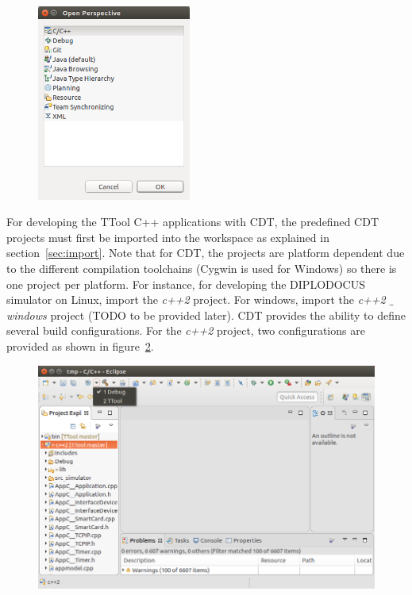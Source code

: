 \documentclass[12pt]{article}
\begin{document}
\begin{figure}[H]
\begin{center}
\includegraphics[width=0.45\textwidth]{images/image10.png}
\end{center}
\caption{}
\label{fig:image10}
\end{figure}

For developing the TTool C++ applications with CDT, the predefined CDT projects
must first be imported into the workspace as explained in
section~\ref{sec:import}. Note that for CDT, the projects are platform dependent
due to the different compilation toolchains (Cygwin is used for Windows) so there is one project per
platform. For instance, for developing the DIPLODOCUS simulator on Linux, import
the \textit{c++}\textit{2} project. For windows, import the
\textit{c++}\textit{2 $  \_  $ windows} project (TODO to be provided later). CDT
provides the ability to define several build configurations. For the
\textit{c++}\textit{2} project, two configurations are provided as shown in
figure~\ref{fig:image11}.

\begin{figure}[H]
\begin{center}
\includegraphics[width=\textwidth]{images/image11.png}
\end{center}
\caption{}
\label{fig:image11}
\end{figure}
\end{document}
